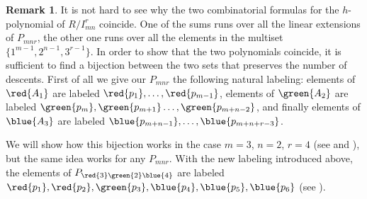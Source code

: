 \documentclass[12pt]{amsart}
\numberwithin{equation}{section}
\theoremstyle{definition}
\newtheorem{remark}[theorem]{Remark}
\begin{document}
\begin{remark} 
It is not hard to see why the two combinatorial formulas for the $h$-polynomial of $R/I_{mn}^r$ coincide. One of the sums runs over all the linear extensions of $P_{mnr}$, the other one runs over all the elements in the multiset $\{1^{m-1},2^{n-1},3^{r-1}\}$. In order to show that the two polynomials coincide, it is sufficient to find a bijection between the two sets that preserves the number of descents. First of all we give our $P_{mnr}$ the following natural labeling: elements of $\red{A_1}$ are labeled $\red{p_1},\ldots, \red{p_{m-1}}$, elements of $\green{A_2}$ are labeled $\green{p_m},\green{p_{m+1}}\ldots, \green{p_{m+n-2}}$, and finally elements of $\blue{A_3}$ are labeled $\blue{p_{m+n-1}},\ldots, \blue{p_{m+n+r-3}}$. %

We will show how this bijection works in the case  $m=3$, $n=2$, $r=4$ (see  and ), but the same idea works for any $P_{mnr}$. With the new labeling  introduced above, the elements of $P_{\red{3}\green{2}\blue{4}}$ are labeled $\red{p_1},\red{p_2},\green{p_3},\blue{p_4}, \blue{p_5},\blue{p_6}$ (see ).
\begin{figure}[H]
\centering
{}
\end{figure}
\end{remark}
\end{document}
